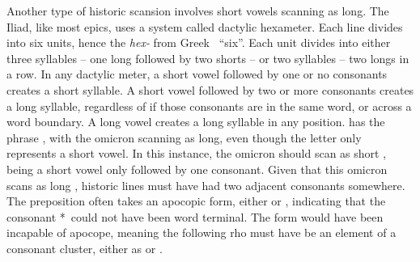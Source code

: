 

Another type of historic scansion involves short vowels scanning as long.  
The Iliad, like most epics, uses a system called dactylic hexameter. Each line divides into six units, hence the \textit{hex-} from Greek \ ``six''. Each unit divides into either three syllables -- one long followed by two shorts -- or two syllables -- two longs in a row.
In any dactylic meter, a short vowel followed by one or no consonants creates a short syllable. A short vowel followed by two or more consonants creates a long syllable, regardless of if those consonants are in the same word, or across a word boundary. A long vowel creates a long syllable in any position.   has the phrase , with the omicron  scanning as long, even though the letter only represents a short vowel.\autocite[V.803]{Iliad_1999} In this instance, the omicron should scan as short , being a short vowel only followed by one consonant. Given that this omicron scans as long , historic lines must have had two adjacent consonants somewhere. The preposition  often takes an apocopic form, either  or , indicating that the consonant *\w\ could not have been word terminal. The form  would have been incapable of apocope, meaning the following rho  must have be an element of a consonant cluster, either as  or .